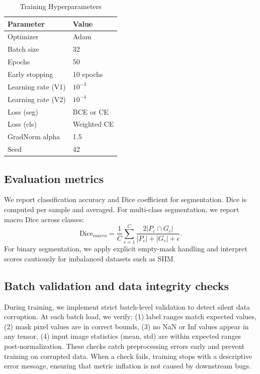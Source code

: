 \documentclass[conference,a4paper]{IEEEtran}
\begin{document}
\begin{table}[t]
\centering
\caption{Training Hyperparameters}
\label{tab:hparams}
\begin{tabular}{l l}
\toprule
Parameter & Value \\
\midrule
Optimizer & Adam \\
Batch size & 32 \\
Epochs & 50 \\
Early stopping & 10 epochs \\
Learning rate (V1) & $10^{-3}$ \\
Learning rate (V2) & $10^{-4}$ \\
Loss (seg) & BCE or CE \\
Loss (cls) & Weighted CE \\
GradNorm alpha & 1.5 \\
Seed & 42 \\
\bottomrule
\end{tabular}
\end{table}

\subsection{Evaluation metrics}
We report classification accuracy and Dice coefficient for segmentation. Dice is computed per sample and averaged. For multi-class segmentation, we report macro Dice across classes:
\begin{equation}
\mathrm{Dice}_{macro} = \frac{1}{C} \sum_{c=1}^C \frac{2|P_c \cap G_c|}{|P_c| + |G_c| + \epsilon}.
\end{equation}
For binary segmentation, we apply explicit empty-mask handling and interpret scores cautiously for imbalanced datasets such as SIIM.

\subsection{Batch validation and data integrity checks}
During training, we implement strict batch-level validation to detect silent data corruption. At each batch load, we verify: (1) label ranges match expected values, (2) mask pixel values are in correct bounds, (3) no NaN or Inf values appear in any tensor, (4) input image statistics (mean, std) are within expected ranges post-normalization. These checks catch preprocessing errors early and prevent training on corrupted data. When a check fails, training stops with a descriptive error message, ensuring that metric inflation is not caused by downstream bugs.
\end{document}
